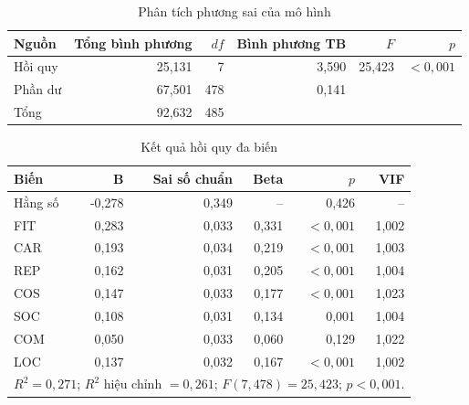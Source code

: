 \begin{table}[H]\centering\caption{Phân tích phương sai của mô hình}\label{tab:anova}
\begin{tabular}{lrrrrr}\toprule Nguồn & Tổng bình phương & $df$ & Bình phương TB & $F$ & $p$\\\midrule
Hồi quy & 25,131 & 7 & 3,590 & 25,423 & $<0,001$\\
Phần dư & 67,501 & 478 & 0,141 & & \\
Tổng & 92,632 & 485 & & & \\\bottomrule
\end{tabular}\end{table}

\begin{table}[H]\centering\caption{Kết quả hồi quy đa biến}\label{tab:reg}
\begin{tabular}{lrrrrr}\toprule Biến & B & Sai số chuẩn & Beta & $p$ & VIF\\\midrule
Hằng số & -0,278 & 0,349 & -- & 0,426 & --\\
FIT & 0,283 & 0,033 & 0,331 & $<0,001$ & 1,002\\
CAR & 0,193 & 0,034 & 0,219 & $<0,001$ & 1,003\\
REP & 0,162 & 0,031 & 0,205 & $<0,001$ & 1,004\\
COS & 0,147 & 0,033 & 0,177 & $<0,001$ & 1,023\\
SOC & 0,108 & 0,031 & 0,134 & 0,001 & 1,004\\
COM & 0,050 & 0,033 & 0,060 & 0,129 & 1,022\\
LOC & 0,137 & 0,032 & 0,167 & $<0,001$ & 1,002\\\bottomrule
\multicolumn{6}{l}{$R^2=0,271$; $R^2$ hiệu chỉnh $=0,261$; $F(7,478)=25,423$; $p<0,001$.}
\end{tabular}\end{table}

